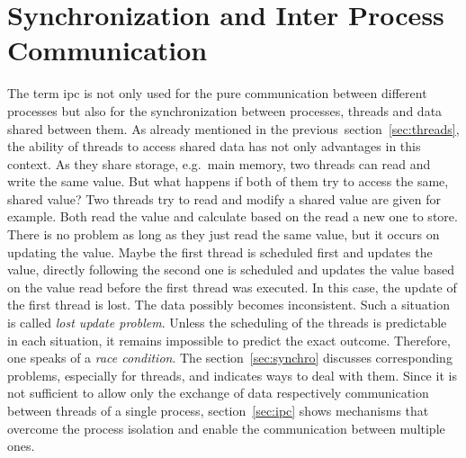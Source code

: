 \section{Synchronization and Inter Process Communication}\label{sec:ipc-and-synchro}
The term \acf{ipc} is not only used for the pure communication between different processes but also for the synchronization between processes, threads and data shared between them.
As already mentioned in the previous~section~\ref{sec:threads}, the ability of threads to access shared data has not only advantages in this context.
As they share storage, e.g.\ main memory, two threads can read and write the same value.
But what happens if both of them try to access the same, shared value?
Two threads try to read and modify a shared value are given for example.
Both read the value and calculate based on the read a new one to store. 
There is no problem as long as they just read the same value, but it occurs on updating the value.
Maybe the first thread is scheduled first and updates the value, directly following the second one is scheduled and updates the value based on the value read before the first thread was executed.
In this case, the update of the first thread is lost. 
The data possibly becomes inconsistent.
Such a situation is called \textit{lost update problem}\cite{glatz2015betriebssysteme}.
Unless the scheduling of the threads is predictable in each situation, it remains impossible to predict the exact outcome.
Therefore, one speaks of a \textit{race condition}\cite{tanenbaum-modern-operating-systems}.
The section~\ref{sec:synchro} discusses corresponding problems, especially for threads, and indicates ways to deal with them.
Since it is not sufficient to allow only the exchange of data respectively communication between threads of a single process, section~\ref{sec:ipc} shows mechanisms that overcome the process isolation and enable the communication between multiple ones.

